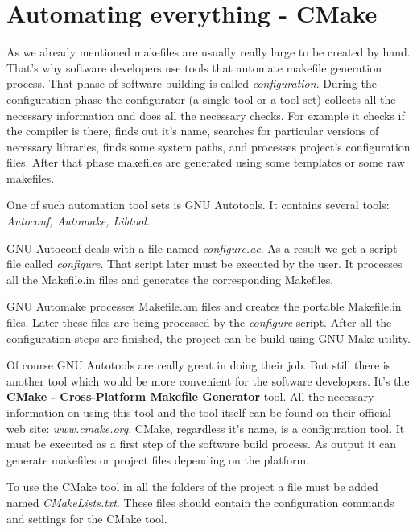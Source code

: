 
\section{Automating everything - CMake}
\label{autotools}

As we already mentioned makefiles are usually really large to be created by hand. That's why software developers use tools that automate makefile generation process. That phase of software building is called \textit { configuration}. During the configuration phase the configurator (a single tool or a tool set) collects all the necessary information and does all the necessary checks. For example it checks if the compiler is there, finds out it's name, searches for particular versions of necessary libraries, finds some system paths, and processes project's configuration files. After that phase makefiles are generated using some templates or some raw makefiles. 

One of such automation tool sets is GNU Autotools. It contains several tools: \textit { Autoconf, Automake, Libtool.} 

GNU Autoconf deals with a file named \textit { configure.ac}. As a result we get a script file called \textit { configure}. That script later must be executed by the user. It processes all the Makefile.in files and generates the corresponding Makefiles.

GNU Automake processes Makefile.am files and creates the portable Makefile.in files. Later these files are being processed by the \textit { configure} script. After all the configuration steps are finished, the project can be build using GNU Make utility.

Of course GNU Autotools are really great in doing their job. But still there is another tool which would be more convenient for the software developers. It's the {\bf CMake - Cross-Platform Makefile Generator} tool. All the necessary information on using this tool and the tool itself can be found on their official web site: \textit { www.cmake.org}. CMake, regardless it's name, is a configuration tool. It must be executed as a first step of the software build process. As output it can generate makefiles or project files depending on the platform. 

To use the CMake tool in all the folders of the project a file must be added named \textit { CMakeLists.txt}. These files should contain the configuration commands and settings for the CMake tool.

